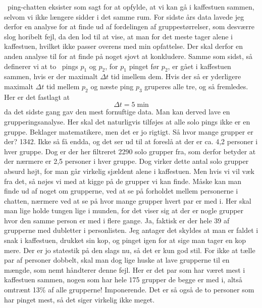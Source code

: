 \begin{article}
\coffee\ ping-chatten eksister som sagt for at opfylde, at vi kan gå i kaffestuen sammen, selvom vi ikke længere sidder i det samme rum. For sidste års data lavede jeg derfor en analyse for at finde ud af fordelingen af gruppestørrelser, som desværre slog horibelt fejl, da den lod til at vise, at man for det meste tager alene i kaffestuen, hvilket ikke passer overens med min opfattelse.
Der skal derfor en anden analyse til for at finde på noget sjovt at konkludere. Samme som sidst, så definerer vi at to \coffee\ pings $p_1$ og $p_2$, for $p_1$ pinget før $p_2$, er gået i kaffestuen sammen, hvis er der maximalt $\Delta t$ tid imellem dem. Hvis der så er yderligere maximalt $\Delta t$ tid mellem $p_2$ og næste ping $p_3$ gruperes alle tre, og så fremledes. Her er det fastlagt at
\[ \Delta t = 5 \; \text{min} \]
da det sidste gang gav den mest fornuftige data. Man kan derved lave en grupperingsanalyse. Her skal det naturligvis tilføjes at alle solo pings ikke er en gruppe. Beklager matematikere, men det er jo rigtigt.
Så hvor mange grupper er der? 1342. Ikke så få endda, og det ser ud til at foreslå at der er ca. 4,2 personer i hver gruppe. Dog er der her filtreret 2290 solo grupper fra, som derfor betyder at der nærmere er 2,5 personer i hver gruppe. Dog virker dette antal solo grupper absurd højt, for man går virkelig sjældent alene i kaffestuen. Men hvis vi vil væk fra det, så nøjes vi med at kigge på de grupper vi kan finde.
Måske kan man finde ud af noget om grupperne, ved at se på forholdet mellem personerne i chatten, nærmere ved at se på hvor mange grupper hvert par er med i. Her skal man lige holde tungen lige i munden, for det viser sig at der er nogle grupper hvor den samme person er med i flere gange. Ja, faktisk er der hele 39 af grupperne med dubletter i personlisten. Jeg antager det skyldes at man er faldet i snak i kaffestuen, drukket sin kop, og pinget igen for at sige man tager en kop mere. Der er jo statestik på den slags nu, så det er kun god stil. For ikke at tælle par af personer dobbelt, skal man dog lige huske at lave grupperne til en mængde, som nemt håndterer denne fejl.
Her er det par som har været mest i kaffestuen sammen, nogen som har hele 175 grupper de begge er med i, altså omtrænt 13\% af alle grupperne! Imponerende. Det er så også de to personer som har pinget mest, så det siger virkelig ikke meget.


\end{article}
